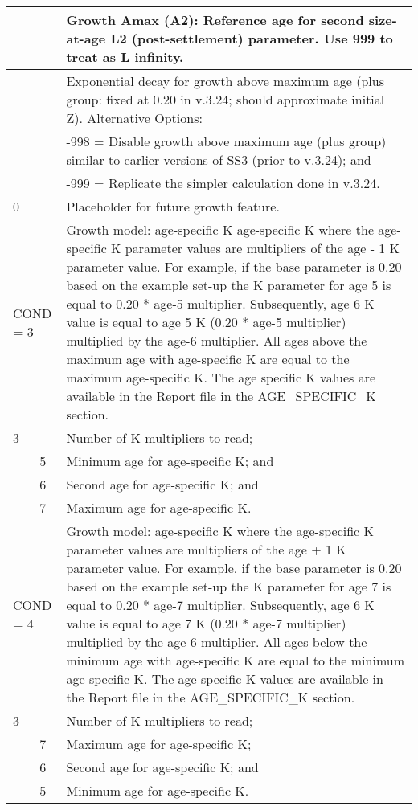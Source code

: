 \begin{longtable}{p{0.5cm} p{2cm} p{12.5cm}}
	\Tstrut 25 & & Growth Amax (A2): Reference age for second size-at-age L2 (post-settlement) parameter. Use 999 to treat as L infinity. \Bstrut\\
	\hline
	
	\Tstrut 0.20 & & Exponential decay for growth above maximum age (plus group: fixed at 0.20 in v.3.24; should approximate initial Z). Alternative Options: \\
				 & & -998 = Disable growth above maximum age (plus group) similar to earlier versions of SS3 (prior to v.3.24); and \\
				 & & -999 = Replicate the simpler calculation done in v.3.24. \Bstrut\\
	\hline
	
	0 & & Placeholder for future growth feature. \Tstrut\Bstrut\\
	\hline

	\multicolumn{2}{l}{COND = 3} & Growth model: age-specific K age-specific K where the age-specific K parameter values are multipliers of the age - 1 K parameter value. For example, if the base parameter is 0.20 based on the example set-up the K parameter for age 5 is equal to 0.20 * age-5 multiplier. Subsequently, age 6 K value is equal to age 5 K (0.20 * age-5 multiplier) multiplied by the age-6 multiplier. All ages above the maximum age with age-specific K are equal to the maximum age-specific K. The age specific K values are available in the Report file in the AGE\_SPECIFIC\_K section. \\
	3 & & Number of K multipliers to read; \\
	& 5 & Minimum age for age-specific K; and \\
	& 6 & Second age for age-specific K; and \\
	& 7 & Maximum age for age-specific K. \Bstrut\\
	
	\multicolumn{2}{l}{COND = 4} & Growth model: age-specific K where the age-specific K parameter values are multipliers of the age + 1 K parameter value. For example, if the base parameter is 0.20 based on the example set-up the K parameter for age 7 is equal to 0.20 * age-7 multiplier. Subsequently, age 6 K value is equal to age 7 K (0.20 * age-7 multiplier) multiplied by the age-6 multiplier. All ages below the minimum age with age-specific K are equal to the minimum age-specific K. The age specific K values are available in the Report file in the AGE\_SPECIFIC\_K section. \\
	3 & & Number of K multipliers to read; \\
	  & 7 & Maximum age for age-specific K; \\
	  & 6 & Second age for age-specific K; and \\
	  & 5 & Minimum age for age-specific K. \Bstrut\\
	\hline
	

\end{longtable}
